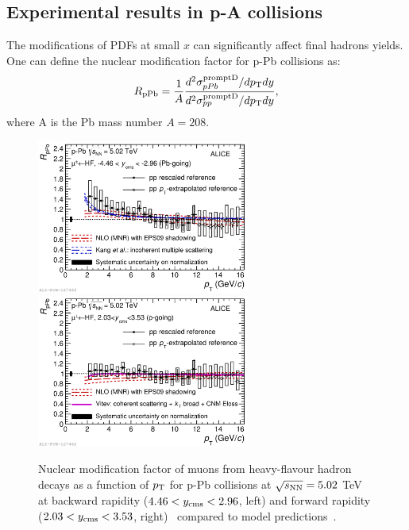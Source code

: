 \subsection{Experimental results in p-A collisions}
The modifications of PDFs at small $x$ can significantly affect final hadrons yields.
One can define the nuclear modification factor for p-Pb collisions as:
\begin{equation}
R_{\rm pPb} = \frac{1}{A}\frac{d^2\sigma_{pPb}^{\rm prompt D}/dp_{\rm T} dy}{d^2\sigma_{pp}^{\rm prompt D}/dp_{\rm T} dy},
\end{equation}
where A is the Pb mass number $A = 208$. \\
\begin{figure}[!ht]
  \centering
  \includegraphics[width=7cm]{FigCap2/2017-Feb-05-Fig2b.pdf}
  \includegraphics[width=7cm]{FigCap2/2017-Feb-05-Fig2a.pdf}
  \caption{Nuclear modification factor of muons from heavy-flavour hadron decays as a function of $p_{\rm T}$ for p-Pb collisions at $\sqrt{s_{\rm NN}} = 5.02$ TeV at backward rapidity ($4.46 < y_{\rm cms} < 2.96$, left) and forward rapidity ($2.03 < y_{\rm cms} < 3.53$, right)~\cite{Acharya:2017hdv} compared to model predictions~\cite{Kang:2014hha,Mangano:1991jk}. }
  \label{fig:muons}
\end{figure}
